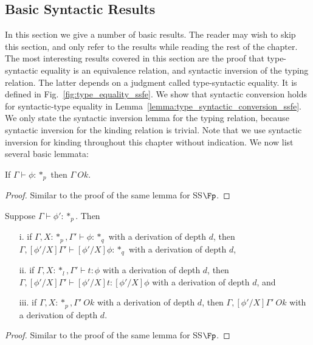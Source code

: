 \subsection{Basic Syntactic Results}
\label{subsec:basic_syntactic_lemmas_ssfe}
In this section we give a number of basic results.  The reader may
wish to skip this section, and only refer to the results while reading
the rest of the chapter.  The most interesting results covered in this
section are the proof that type-syntactic equality is an equivalence
relation, and syntactic inversion of the typing relation.  The latter
depends on a judgment called type-syntactic equality.  It is defined
in Fig.~\ref{fig:type_equality_ssfe}.  We show that syntactic
conversion holds for syntactic-type equality in
Lemma~\ref{lemma:type_syntactic_conversion_ssfe}.  We only state the
syntactic inversion lemma for the typing relation, because syntactic
inversion for the kinding relation is trivial.  Note that we use
syntactic inversion for kinding throughout this chapter without
indication.  We now list several basic lemmata:
\begin{lemma}
  If $\Gamma \vdash \phi:*_p$ then $\Gamma\ Ok$.
  \label{lemma:kinding_ok_ssfe}
\end{lemma}
\begin{proof}
  Similar to the proof of the same lemma for SS$\Fp$.
\end{proof}
\begin{lemma}
  Suppose $\Gamma \vdash \phi':*_p$.  Then
  \begin{itemize}
  \item[i.] if $\Gamma,X:*_p,\Gamma' \vdash \phi:*_q$ with a
    derivation of depth $d$, then $\Gamma,[\phi'/X]\Gamma' \vdash
    [\phi'/X]\phi:*_q$ with a derivation of depth $d$,
    
  \item[ii.] if $\Gamma, X:*_l,\Gamma' \vdash t:\phi$ with a
    derivation of depth $d$, then $\Gamma,[\phi'/X]\Gamma' \vdash
    [\phi'/X]t:[\phi'/X]\phi$ with a derivation of depth $d$, and
    
  \item[iii.] if $\Gamma,X:*_p,\Gamma'\ Ok$ with a derivation of depth $d$, then 
    $\Gamma,[\phi'/X]\Gamma'\ Ok$ with a derivation of depth $d$.
  \end{itemize}
  \label{lemma:substitution_for_kinding_ssfe}
\end{lemma}
\begin{proof}
  Similar to the proof of the same lemma for SS$\Fp$.
\end{proof}

